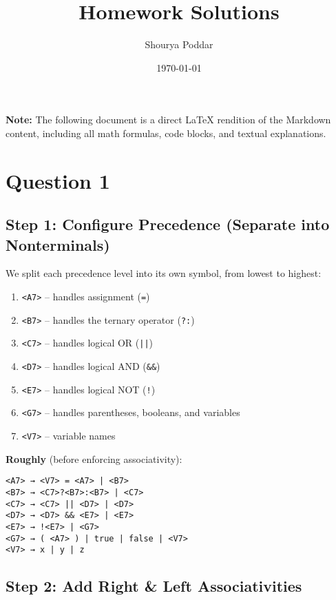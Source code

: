 \documentclass[12pt]{article}
\title{Homework Solutions}
\author{Shourya Poddar}
\date{\today}
\begin{document}
    \maketitle

    \noindent
    \textbf{Note:} The following document is a direct LaTeX rendition of the Markdown content, including all math formulas, code blocks, and textual explanations.

    \section*{Question 1}

    \subsection*{Step 1: Configure Precedence (Separate into Nonterminals)}

    We split each precedence level into its own symbol, from lowest to highest:

    \begin{enumerate}
        \item \texttt{<A7>} -- handles assignment (\texttt{=})
        \item \texttt{<B7>} -- handles the ternary operator (\texttt{?:})
        \item \texttt{<C7>} -- handles logical OR (\texttt{||})
        \item \texttt{<D7>} -- handles logical AND (\texttt{\&&})
        \item \texttt{<E7>} -- handles logical NOT (\texttt{!})
        \item \texttt{<G7>} -- handles parentheses, booleans, and variables
        \item \texttt{<V7>} -- variable names
    \end{enumerate}

    \noindent\textbf{Roughly} (before enforcing associativity):
    \begin{verbatim}
<A7> → <V7> = <A7> | <B7>
<B7> → <C7>?<B7>:<B7> | <C7>
<C7> → <C7> || <D7> | <D7>
<D7> → <D7> && <E7> | <E7>
<E7> → !<E7> | <G7>
<G7> → ( <A7> ) | true | false | <V7>
<V7> → x | y | z
    \end{verbatim}

    \subsection*{Step 2: Add Right \& Left Associativities}
\end{document}
